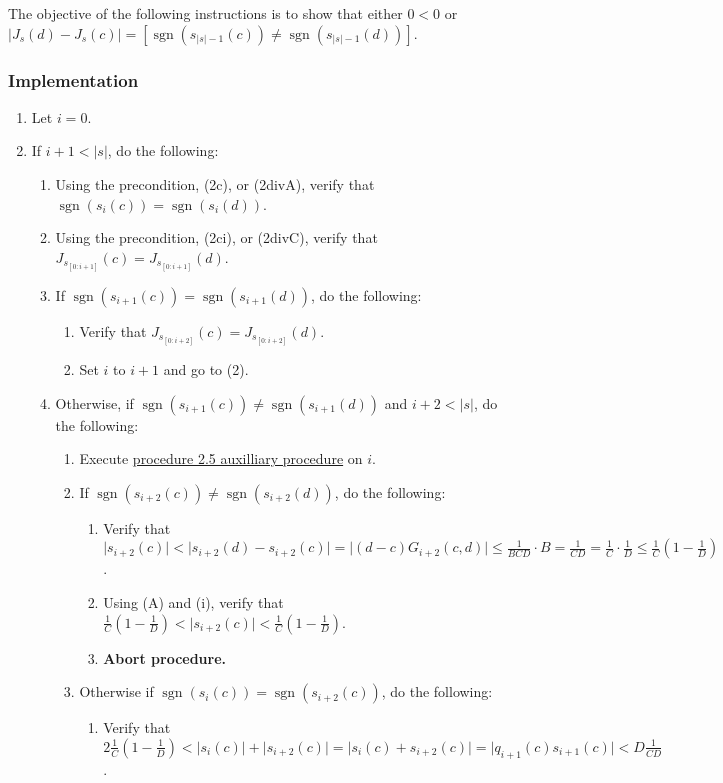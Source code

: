 \documentclass[twocolumn]{article}
\DeclareMathOperator{\sgn}{sgn}
\newcommand{\implementation}{\subsubsection*{Implementation}}
\begin{document}
				The objective of the following instructions is to show that either $0<0$ or $\lvert J_{s}(d)-J_{s}(c)\rvert=[\sgn(s_{\lvert s\rvert-1}(c))\ne\sgn(s_{\lvert s\rvert-1}(d))]$.
			\implementation
				\begin{enumerate}
					\item Let $i=0$.
					\item If $i+1<\lvert s\rvert$, do the following:
					\begin{enumerate}
						\item Using the precondition, (2c), or (2divA), verify that $\sgn(s_i(c))=\sgn(s_i(d))$.
						\item Using the precondition, (2ci), or (2divC), verify that $J_{s_{[0:i+1]}}(c)=J_{s_{[0:i+1]}}(d)$.
						\item If $\sgn(s_{i+1}(c))=\sgn(s_{i+1}(d))$, do the following:
						\begin{enumerate}
							\item Verify that $J_{s_{[0:i+2]}}(c)=J_{s_{[0:i+2]}}(d)$.
							\item Set $i$ to $i+1$ and go to (2).
						\end{enumerate}
						\item Otherwise, if $\sgn(s_{i+1}(c))\ne\sgn(s_{i+1}(d))$ and $i+2<\lvert s\rvert$, do the following:
						\begin{enumerate}
							\item Execute \hyperref[sec:procedure 2.5 auxilliary procedure]{procedure 2.5 auxilliary procedure} on $i$.
							\item If $\sgn(s_{i+2}(c))\ne\sgn(s_{i+2}(d))$, do the following:
							\begin{enumerate}
								\item Verify that $\lvert s_{i+2}(c)\rvert<\lvert s_{i+2}(d)-s_{i+2}(c)\rvert=\lvert (d-c)G_{i+2}(c,d)\rvert\le\frac{1}{BCD}\cdot B=\frac{1}{CD}=\frac{1}{C}\cdot\frac{1}{D}\le\frac{1}{C}(1-\frac{1}{D})$.
								\item Using (A) and (i), verify that $\frac{1}{C}(1-\frac{1}{D})<\lvert s_{i+2}(c)\rvert<\frac{1}{C}(1-\frac{1}{D})$.
								\item \textbf{Abort procedure.}
							\end{enumerate}
							\item Otherwise if $\sgn(s_i(c))=\sgn(s_{i+2}(c))$, do the following:
							\begin{enumerate}
								\item Verify that $2\frac{1}{C}(1-\frac{1}{D})<\lvert s_i(c)\rvert+\lvert s_{i+2}(c)\rvert=\lvert s_i(c)+s_{i+2}(c)\rvert=\lvert q_{i+1}(c)s_{i+1}(c)\rvert<D\frac{1}{CD}$.

\end{enumerate}
\end{enumerate}
\end{enumerate}
\end{enumerate}
\end{document}
